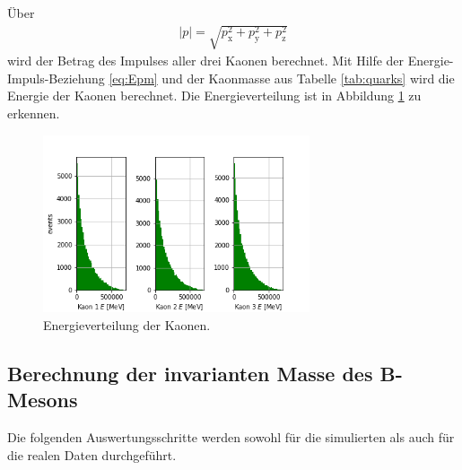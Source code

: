 Über
\begin{align}
  |p|=\sqrt{p_{\mathrm{x}}^2 + p_{\mathrm{y}}^2 + p_{\mathrm{z}}^2 }
  \label{eq:Betrag}
\end{align}
wird der Betrag des Impulses aller drei Kaonen berechnet. Mit Hilfe der
Energie-Impuls-Beziehung \eqref{eq:Epm} und der Kaonmasse aus Tabelle
\ref{tab:quarks} wird die Energie der Kaonen berechnet. Die Energieverteilung
ist in Abbildung \ref{fig:Energie1} zu erkennen.
\begin{figure}
  \centering
  \includegraphics[width=0.7\textwidth]{plots/sim_Eall_hist.png}
  \caption{Energieverteilung der Kaonen.}
  \label{fig:Energie1}
\end{figure}
\FloatBarrier

\subsection{Berechnung der invarianten Masse des B-Mesons}
Die folgenden Auswertungsschritte werden sowohl für die simulierten als auch für die realen Daten durchgeführt.

